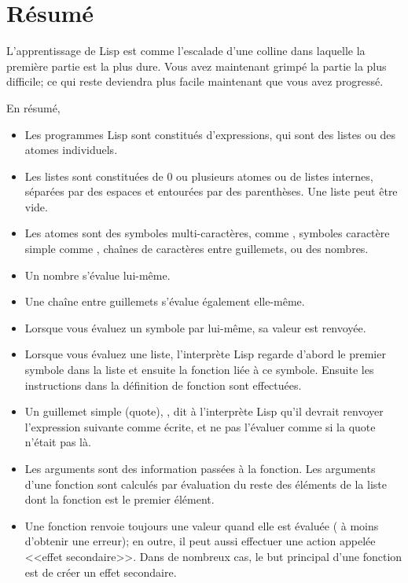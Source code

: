 \section{Résumé}

L'apprentissage de Lisp est comme l'escalade d'une colline dans
laquelle la première partie est la plus dure. Vous avez maintenant
grimpé la partie la plus difficile; ce qui reste deviendra plus facile
maintenant que vous avez progressé.

En résumé,
\begin{itemize}
\item Les programmes Lisp sont constitués d'expressions, qui sont des
  listes ou des atomes individuels.
\item Les listes sont constituées de 0 ou plusieurs atomes ou de
  listes internes, séparées par des espaces et entourées par des
  parenthèses. Une liste peut être vide.
\item Les atomes sont des symboles multi-caractères, comme
  , symboles caractère simple comme \tm{+},
  chaînes de caractères entre guillemets, ou des nombres.
\item Un nombre s'évalue lui-même.
\item Une chaîne entre guillemets s'évalue également elle-même.
\item Lorsque vous évaluez un symbole par lui-même, sa valeur est
  renvoyée.
\item Lorsque vous évaluez une liste, l'interprète Lisp regarde
  d'abord le premier symbole dans la liste et ensuite la fonction liée
  à ce symbole. Ensuite les instructions dans la définition de
  fonction sont effectuées.
\item Un guillemet simple (quote), , dit à l'interprète Lisp
  qu'il devrait renvoyer l'expression suivante comme écrite, et ne pas
  l'évaluer comme si la quote n'était pas là.
\item Les arguments sont des information passées à la fonction. Les
  arguments d'une fonction sont calculés par évaluation du reste des
  éléments de la liste dont la fonction est le premier élément.
\item Une fonction renvoie toujours une valeur quand elle est évaluée
  ( à moins d'obtenir une erreur); en outre, il peut aussi effectuer
  une action appelée <<effet secondaire>>. Dans de nombreux cas, le
  but principal d'une fonction est de créer un effet secondaire.
\end{itemize}




